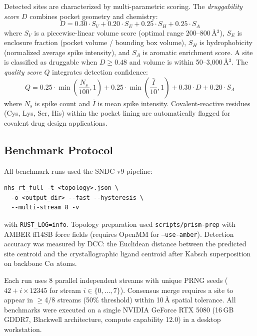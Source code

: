 \documentclass{sn-jnl}
\begin{document}
Detected sites are characterized by multi-parametric scoring. The \textit{druggability score}
$D$ combines pocket geometry and chemistry:
\begin{equation}
  D = 0.30 \cdot S_V + 0.20 \cdot S_E + 0.25 \cdot S_H + 0.25 \cdot S_A
  \label{eq:druggability}
\end{equation}
where $S_V$ is a piecewise-linear volume score (optimal range 200--800\,\AA$^3$), $S_E$ is
enclosure fraction (pocket volume / bounding box volume), $S_H$ is hydrophobicity
(normalized average spike intensity), and $S_A$ is aromatic enrichment score. A site is
classified as druggable when $D \geq 0.48$ and volume is within 50--3{,}000\,\AA$^3$. The
\textit{quality score} $Q$ integrates detection confidence:
\begin{equation}
  Q = 0.25 \cdot \min\!\left(\frac{N_s}{100}, 1\right) + 0.25 \cdot
  \min\!\left(\frac{\bar{I}}{10}, 1\right) + 0.30 \cdot D + 0.20 \cdot S_A
  \label{eq:quality}
\end{equation}
where $N_s$ is spike count and $\bar{I}$ is mean spike intensity. Covalent-reactive residues
(Cys, Lys, Ser, His) within the pocket lining are automatically flagged for covalent drug
design applications.

\subsection{Benchmark Protocol}
\label{sec:benchmark}

All benchmark runs used the SNDC v9 pipeline:
{\small\begin{verbatim}
nhs_rt_full -t <topology>.json \
  -o <output_dir> --fast --hysteresis \
  --multi-stream 8 -v
\end{verbatim}}
\noindent with \texttt{RUST\_LOG=info}. Topology preparation used
\texttt{scripts/prism-prep} with AMBER ff14SB force fields (requires OpenMM for
\texttt{--use-amber}). Detection accuracy was measured by DCC: the Euclidean distance between
the predicted site centroid and the crystallographic ligand centroid after Kabsch
superposition on backbone C$\alpha$ atoms.

Each run uses 8 parallel independent streams with unique PRNG seeds ($42 + i \times 12345$
for stream $i \in \{0, \ldots, 7\}$). Consensus merge requires a site to appear in $\geq$4/8
streams (50\% threshold) within 10\,\AA{} spatial tolerance. All benchmarks were executed on a
single NVIDIA GeForce RTX 5080 (16\,GB GDDR7, Blackwell architecture, compute capability
12.0) in a desktop workstation.
\end{document}

